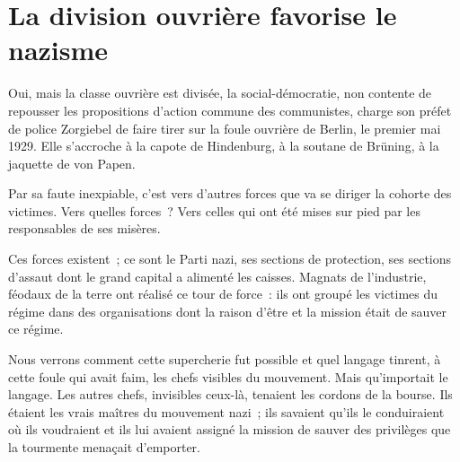 \documentclass[french,twoside]{book} %
\begin{document}
\section[La division ouvrière favorise le nazisme]{La division ouvrière favorise le nazisme}
\noindent Oui, mais la classe ouvrière est divisée, la social-démocratie, non contente de repousser les propositions d’action commune des communistes, charge son préfet de police Zorgiebel de faire tirer sur la foule ouvrière de Berlin, le premier mai 1929. Elle s’accroche à la capote de Hindenburg, à la soutane de Brüning, à la jaquette de von Papen.\par
Par sa faute inexpiable, c’est vers d’autres forces que va se diriger la cohorte des victimes. Vers quelles forces ? Vers celles qui ont été mises sur pied par les responsables de ses misères.\par
Ces forces existent ; ce sont le Parti nazi, ses sections de protection, ses sections d’assaut dont le grand capital a alimenté les caisses. Magnats de l’industrie, féodaux de la terre ont réalisé ce tour de force : ils ont groupé les victimes du régime dans des organisations dont la raison d’être et la mission était de sauver ce régime.\par
Nous verrons comment cette supercherie fut possible et quel langage tinrent, à cette foule qui avait faim, les chefs visibles du mouvement. Mais qu’importait le langage. Les autres chefs, invisibles ceux-là, tenaient les cordons de la bourse. Ils étaient les vrais maîtres du mouvement nazi ; ils savaient qu’ils le conduiraient où ils voudraient et ils lui avaient assigné la mission de sauver des privilèges que la tourmente menaçait d’emporter.
\end{document}
